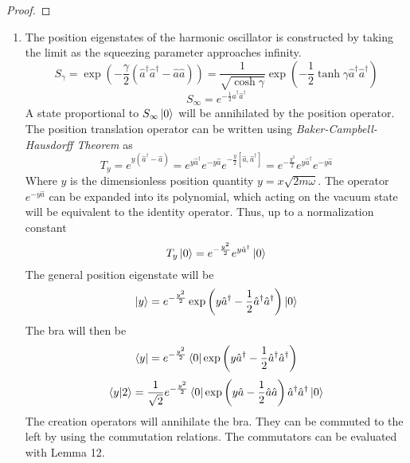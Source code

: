 \begin{sol}
\begin{proof}
\end{proof}
\begin{enumerate}[label=\textbf{(\alph*)}]
    \item 
    The position eigenstates of the harmonic oscillator is constructed by taking the limit as the squeezing parameter approaches infinity. 
    \begin{equation}
	S_\gamma = \exp\left(-\frac{\gamma}{2}(\hat a^\dagger\hat a^\dagger-\hat a\hat a)\right)=\frac{1}{\sqrt{\cosh\gamma}}\exp\left(-\frac{1}{2}\tanh\gamma\hat a^\dagger\hat a^\dagger\right)
\end{equation}
    \begin{equation}
	S_\infty=e^{-\frac{1}{2}\hat a^\dagger\hat a^\dagger}
\end{equation}
    A state proportional to $S_\infty\ket 0$ will be annihilated by the position operator.\\
    The position translation operator can be written using \textit{Baker-Campbell-Hausdorff Theorem} as
    \begin{equation}
	T_y = e^{y(\hat a^\dagger-\hat a)}=e^{y\hat a^\dagger}e^{-y\hat a}e^{-\frac{y}{2}[\hat a, \hat a^\dagger]}=e^{-\frac{y^2}{2}}e^{y\hat a^\dagger}e^{-y\hat a}
\end{equation} 
    Where $y$ is the dimensionless position quantity $y= x\sqrt{2m\omega}$. The operator $e^{-y\hat a}$ can be expanded into its polynomial, which acting on the vacuum state will be equivalent to the identity operator. Thus, up to a normalization constant
    \begin{equation}
	T_y\ket 0=e^{-\frac{y^2}{2}}e^{y\hat a^\dagger}\ket 0
\end{equation}
    The general position eigenstate will be
    \begin{equation}
	\ket y = e^{-\frac{y^2}{2}}\exp\left(y\hat a^\dagger-\frac{1}{2}\hat a^\dagger\hat a^\dagger\right)\ket 0
\end{equation}
    The bra will then be 
    \begin{equation}
	\bra y =  e^{-\frac{y^2}{2}}\bra 0\exp\left(y\hat a^\dagger-\frac{1}{2}\hat a^\dagger\hat a^\dagger\right)
\end{equation} \begin{equation}
	\braket{y}{2}=\frac{1}{\sqrt 2}e^{-\frac{y^2}{2}}\bra 0\exp\left(y\hat a-\frac{1}{2}\hat a\hat a\right)\hat a^\dagger\hat a^\dagger\ket 0
\end{equation}
    The creation operators will annihilate the bra. They can be commuted to the left by using the commutation relations. The commutators can be evaluated with Lemma 12.

\end{enumerate}
\end{sol}

